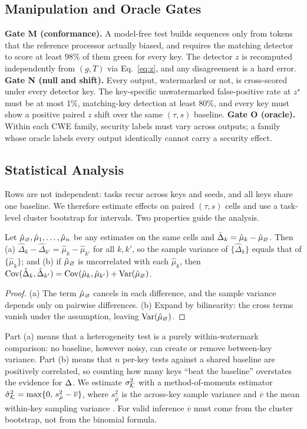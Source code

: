 \subsection{Manipulation and Oracle Gates}
\label{sec:gates}
\textbf{Gate M (conformance).} A model-free test builds sequences only from tokens that the reference processor actually biased, and requires the matching detector to score at least 98\% of them green for every key. The detector $z$ is recomputed independently from $(g,T)$ via Eq.~\eqref{eq:z}, and any disagreement is a hard error. \textbf{Gate N (null and shift).} Every output, watermarked or not, is cross-scored under every detector key. The key-specific unwatermarked false-positive rate at $z^\star$ must be at most 1\%, matching-key detection at least 80\%, and every key must show a positive paired $z$ shift over the same $(\tau,s)$ baseline. \textbf{Gate O (oracle).} Within each CWE family, security labels must vary across outputs; a family whose oracle labels every output identically cannot carry a security effect.

\subsection{Statistical Analysis}
Rows are not independent: tasks recur across keys and seeds, and all keys share one baseline. We therefore estimate effects on paired $(\tau,s)$ cells and use a task-level cluster bootstrap for intervals. Two properties guide the analysis.

\begin{proposition}\label{prop:baseline}
Let $\hat\mu_\varnothing,\hat\mu_1,\ldots,\hat\mu_n$ be any estimates on the same cells and $\hat\Delta_k=\hat\mu_k-\hat\mu_\varnothing$. Then (a) $\hat\Delta_k-\hat\Delta_{k'}=\hat\mu_k-\hat\mu_{k'}$ for all $k,k'$, so the sample variance of $\{\hat\Delta_k\}$ equals that of $\{\hat\mu_k\}$; and (b) if $\hat\mu_\varnothing$ is uncorrelated with each $\hat\mu_k$, then $\operatorname{Cov}(\hat\Delta_k,\hat\Delta_{k'})=\operatorname{Cov}(\hat\mu_k,\hat\mu_{k'})+\operatorname{Var}(\hat\mu_\varnothing)$.
\end{proposition}
\begin{proof}
(a) The term $\hat\mu_\varnothing$ cancels in each difference, and the sample variance depends only on pairwise differences. (b) Expand by bilinearity: the cross terms vanish under the assumption, leaving $\operatorname{Var}(\hat\mu_\varnothing)$.
\end{proof}

Part (a) means that a heterogeneity test is a purely within-watermark comparison: no baseline, however noisy, can create or remove between-key variance. Part (b) means that $n$ per-key tests against a shared baseline are positively correlated, so counting how many keys ``beat the baseline'' overstates the evidence for $\Delta$. We estimate $\sigma^2_{\mathcal{K}}$ with a method-of-moments estimator $\hat\sigma^2_{\mathcal{K}}=\max\{0,\,s^2_{\hat\mu}-\overline{v}\}$, where $s^2_{\hat\mu}$ is the across-key sample variance and $\overline{v}$ the mean within-key sampling variance \citep{dersimonian1986meta}. For valid inference $\overline{v}$ must come from the cluster bootstrap, not from the binomial formula.

